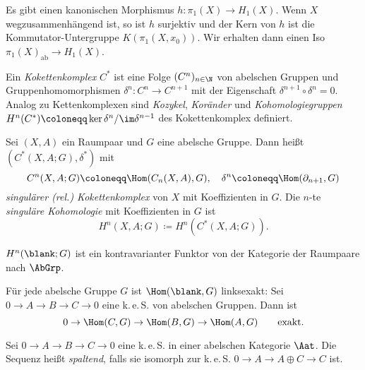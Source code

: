 \documentclass{cheat-sheet}
\newcommand{\keS}{k.\,e.\,S.} %
\begin{document}

\begin{prop}
  Es gibt einen kanonischen Morphismus $h : \pi_1(X) \to H_1(X)$. Wenn $X$ wegzusammenhängend ist, so ist $h$ surjektiv und der Kern von $h$ ist die Kommutator-Untergruppe $K(\pi_1(X, x_0))$. Wir erhalten dann einen Iso $\pi_1(X)_{\text{ab}} \to H_1(X)$.
\end{prop}



\begin{defn}
  Ein \emph{Kokettenkomplex} $C^*$ ist eine Folge $(C^n)_{n \in \N}$ von abelschen Gruppen und Gruppenhomomorphismen $\delta^n : C^n \to C^{n+1}$ mit der Eigenschaft $\delta^{n+1} \circ \delta^n = 0$. Analog zu Kettenkomplexen sind \emph{Kozykel}, \emph{Koränder} und \emph{Kohomologiegruppen} $H^n(C^*) \coloneqq \ker \delta^n / \im \delta^{n-1}$ des Kokettenkomplex definiert.
\end{defn}

\begin{defn}
  Sei $(X, A)$ ein Raumpaar und $G$ eine abelsche Gruppe. Dann heißt $(C^*(X, A; G), \delta^*)$ mit
  \[
    C^n(X, A; G) \coloneqq \Hom(C_n(X, A), G), \quad
    \delta^n \coloneqq \Hom(\partial_{n+1}, G)
  \]
  \emph{singulärer (rel.) Kokettenkomplex} von $X$ mit Koeffizienten in $G$. Die $n$-te \emph{singuläre Kohomologie} mit Koeffizienten in $G$ ist
  \[ H^n(X, A; G) \coloneqq H^n(C^*(X, A; G)). \]
\end{defn}

\begin{nota}
   \quad
\end{nota}

\begin{bem}
  $H^n(\blank; G)$ ist ein kontravarianter Funktor von der Kategorie der Raumpaare nach $\AbGrp$.
\end{bem}

\begin{lem}
  Für jede abelsche Gruppe $G$ ist $\Hom(\blank, G)$ linksexakt:
  Sei $0 \to A \to B \to C \to 0$ eine \keS{} von abelschen Gruppen. Dann ist
  \[
    0 \to \Hom(C, G) \to \Hom(B, G) \to \Hom(A, G)
    \qquad \text{exakt.}
  \]
\end{lem}

\begin{defn}
  Sei $0 \to A \to B \to C \to 0$ eine \keS{} in einer abelschen Kategorie $\Aat$. Die Sequenz heißt \emph{spaltend}, falls sie isomorph zur \keS{} $0 \to A \to A \oplus C \to C$ ist.
\end{defn}
\end{document}
